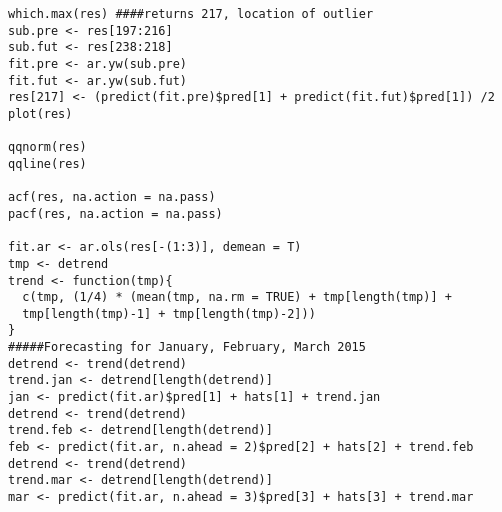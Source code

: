 \documentclass[twoside,12pt]{article}
\begin{document}
\begin{verbatim}
which.max(res) ####returns 217, location of outlier
sub.pre <- res[197:216]
sub.fut <- res[238:218]
fit.pre <- ar.yw(sub.pre)
fit.fut <- ar.yw(sub.fut)
res[217] <- (predict(fit.pre)$pred[1] + predict(fit.fut)$pred[1]) /2
plot(res)

qqnorm(res)
qqline(res)

acf(res, na.action = na.pass)
pacf(res, na.action = na.pass)

fit.ar <- ar.ols(res[-(1:3)], demean = T)
tmp <- detrend
trend <- function(tmp){
  c(tmp, (1/4) * (mean(tmp, na.rm = TRUE) + tmp[length(tmp)] + 
  tmp[length(tmp)-1] + tmp[length(tmp)-2]))
}
#####Forecasting for January, February, March 2015
detrend <- trend(detrend)
trend.jan <- detrend[length(detrend)]
jan <- predict(fit.ar)$pred[1] + hats[1] + trend.jan
detrend <- trend(detrend)
trend.feb <- detrend[length(detrend)]
feb <- predict(fit.ar, n.ahead = 2)$pred[2] + hats[2] + trend.feb
detrend <- trend(detrend)
trend.mar <- detrend[length(detrend)]
mar <- predict(fit.ar, n.ahead = 3)$pred[3] + hats[3] + trend.mar
\end{verbatim}
\end{document}
